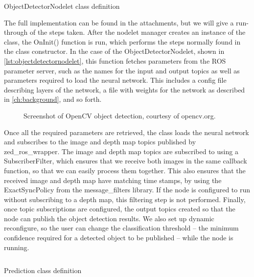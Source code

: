 \documentclass[\rootfolder/main.tex]{subfiles}
\begin{document}
\begin{listing}
    \inputminted{cpp}{\rootfolder/Chapters/Chapter5/Listings/ObjectDetectorNodelet}
    \caption{ObjectDetectorNodelet class definition\label{lst:objectdetectornodelet}}
\end{listing}

The full implementation can be found in the attachments, but we will give a run-through of the steps taken.
After the nodelet manager creates an instance of the class, the OnInit() function is run, which performs the steps normally found in the class constructor.
In the case of the ObjectDetectorNodelet, shown in \cref{lst:objectdetectornodelet}, this function fetches parameters from the ROS parameter server, such as the names for the input and output topics as well as parameters required to load the neural network.
This includes a config file describing layers of the network, a file with weights for the network as described in \cref{ch:background}, and so forth.

\begin{figure}[ht]
    \caption[Screenshot of OpenCV object detection.]{Screenshot of OpenCV object detection, courtesy of opencv.org.\label{fig:opencv}}
\end{figure}

Once all the required parameters are retrieved, the class loads the neural network and subscribes to the image and depth map topics published by zed\_ros\_wrapper.
The image and depth map topics are subscribed to using a SubscriberFilter, which ensures that we receive both images in the same callback function, so that we can easily process them together.
This also ensures that the received image and depth map have matching time stamps, by using the ExactSyncPolicy from the message\_filters library.
If the node is configured to run without subscribing to a depth map, this filtering step is not performed.
Finally, once topic subscriptions are configured, the output topics created so that the node can publish the object detection results.
We also set up dynamic reconfigure, so the user can change the classification threshold -- the minimum confidence required for a detected object to be published -- while the node is running.

\begin{listing}
    \inputminted{cpp}{\rootfolder/Chapters/Chapter5/Listings/Prediction}
    \caption{Prediction class definition\label{lst:prediction}}
\end{listing}
\end{document}

